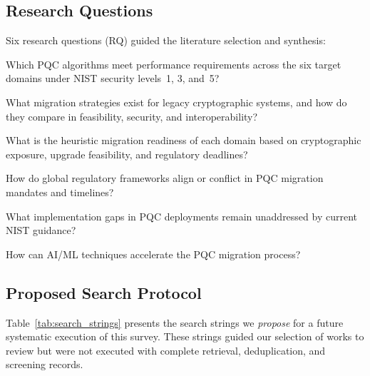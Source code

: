 \documentclass[journal]{IEEEtran}
\begin{document}
\subsection{Research Questions}

Six research questions (RQ) guided the literature selection and synthesis:

\begin{description}[leftmargin=1.5em,labelwidth=1.2em]
  \item[RQ1] Which PQC algorithms meet performance requirements across the six
  target domains under NIST security levels~1, 3, and~5?
  \item[RQ2] What migration strategies exist for legacy cryptographic systems,
  and how do they compare in feasibility, security, and interoperability?
  \item[RQ3] What is the heuristic migration readiness of each domain based
  on cryptographic exposure, upgrade feasibility, and regulatory deadlines?
  \item[RQ4] How do global regulatory frameworks align or conflict in PQC
  migration mandates and timelines?
  \item[RQ5] What implementation gaps in PQC deployments remain unaddressed
  by current NIST guidance?
  \item[RQ6] How can AI/ML techniques accelerate the PQC migration process?
\end{description}

\subsection{Proposed Search Protocol}

Table~\ref{tab:search_strings} presents the search strings we \emph{propose}
for a future systematic execution of this survey. These strings guided our
selection of works to review but were not executed with complete retrieval,
deduplication, and screening records.
\end{document}
